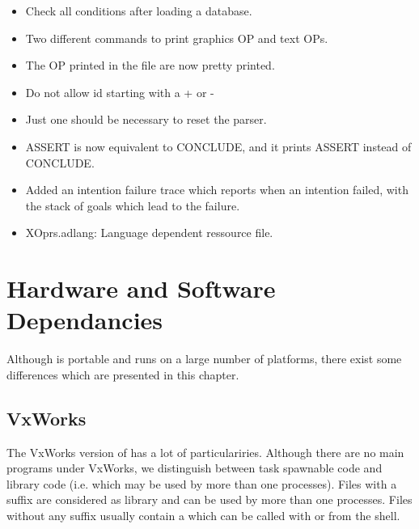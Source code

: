 \begin{itemize}
\item Check all conditions after loading a database.

\item Two different commands to print graphics OP and text OPs.

\item The OP printed in the file are now pretty printed.

\item Do not allow id starting with a + or -

\item Just one  should be necessary to reset the \OPRSS{} parser.

\item ASSERT is now equivalent to CONCLUDE, and it prints ASSERT instead of
CONCLUDE.

\item Added an intention failure trace which reports when
an intention failed, with the stack of goals which lead to the
failure.

\item XOprs.adlang: Language dependent ressource file.

\end{itemize}

\chapter{Hardware and Software Dependancies}

Although \COPRS{} is portable and runs on a large number of platforms, there
exist some differences which are presented in this chapter.



\section{VxWorks}

The VxWorks version of \COPRS{} has a lot of particulariries. Although there are
no main programs under VxWorks, we distinguish between task spawnable code and
library code (i.e. which may be used by more than one processes). Files with a
 suffix are considered as library and can be used by more than one
processes. Files without any suffix usually contain a  which can be
called with  or from the shell.


